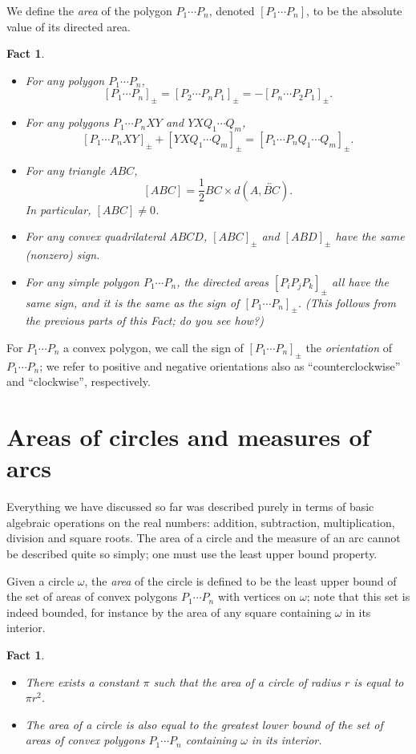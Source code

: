 \documentclass[12pt]{book}
\numberwithin{exc}{section}
\numberwithin{figure}{section}
\newtheorem{fact}[theorem]{Fact}
\numberwithin{equation}{theorem}
\def\line#1{\overleftrightarrow{#1}}
\begin{document}
We define the \emph{area} of the polygon $P_1\cdots P_n$, 
denoted $[P_1\cdots P_n]$,
to be the absolute value of its directed area.
\begin{fact}
\begin{itemize}
\item
For any polygon $P_1\cdots P_n$,
\[
[P_1\cdots P_n]_{\pm} = [P_2\cdots P_n P_1]_{\pm}
= -[P_n\cdots P_2P_1]_{\pm}.
\]
\item
For any polygons $P_1\cdots P_nXY$ and $YXQ_1\cdots Q_m$,
\[
[P_1\cdots P_nXY]_{\pm} + [YXQ_1\cdots Q_m]_{\pm}
= [P_1\cdots P_nQ_1\cdots Q_m]_{\pm}.
\]
\item
For any triangle $ABC$,
\[
[ABC] = \frac{1}{2} BC \times d(A, \line{BC}).
\]
In particular, $[ABC] \neq 0$.
\item
For any convex quadrilateral $ABCD$, $[ABC]_{\pm}$ and $[ABD]_{\pm}$
have the same (nonzero) sign.
\item
For any simple polygon $P_1\cdots P_n$, the directed areas
$[P_iP_jP_k]_{\pm}$ all have the same sign, and it is the same as the sign
of $[P_1\cdots P_n]_{\pm}$. (This follows from the previous parts of this
Fact; do you see how?)
\end{itemize}
\end{fact}

For $P_1\cdots P_n$ a convex polygon,
we call the sign of $[P_1\cdots P_n]_{\pm}$ the
\emph{orientation} of $P_1\cdots P_n$;
we refer to positive and negative orientations also as
``counterclockwise'' and ``clockwise'', respectively.

\section{Areas of circles and measures of arcs}

Everything we have discussed so far was described purely in terms of
basic algebraic operations on the real numbers: addition, subtraction,
multiplication, division and square roots. The area of a circle and the
measure of an arc cannot be described
quite so simply; one must use the least upper bound property.

Given a circle $\omega$, the \emph{area} of the circle
 is defined to be the least upper bound of the
set of areas of convex polygons $P_1\cdots P_n$ with vertices on $\omega$;
note that this set is indeed bounded, for instance by the area of any
square containing $\omega$ in its interior.
\begin{fact}
\begin{itemize}
\item
There exists a constant $\pi$ such that the area of a circle of radius
$r$ is equal to $\pi r^2$.
\item
The area of a circle is also equal to the greatest lower bound of the
set of areas of convex polygons $P_1\cdots P_n$ containing $\omega$ in its
interior.
\end{itemize}
\end{fact}
\end{document}
